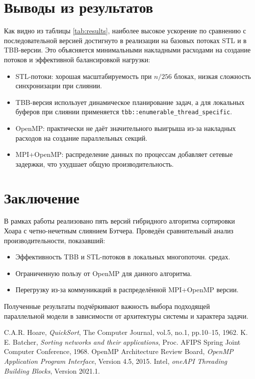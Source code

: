 \documentclass[12pt]{article}
\begin{document}
\section{Выводы из результатов}
\hspace*{1.25em}Как видно из таблицы \ref{tab:results}, наиболее высокое ускорение по сравнению с последовательной версией достигнуто в реализации на базовых потоках STL и в TBB-версии. Это объясняется минимальными накладными расходами на создание потоков и эффективной балансировкой нагрузки:

\begin{itemize}
  \item STL-потоки: хорошая масштабируемость при $n/256$ блоках, низкая сложность синхронизации при слиянии.
  \item TBB-версия использует динамическое планирование задач, а для локальных буферов при слиянии применяется \texttt{tbb::enumerable\_thread\_specific}.
  \item OpenMP: практически не даёт значительного выигрыша из-за накладных расходов на создание параллельных секций.
  \item MPI+OpenMP: распределение данных по процессам добавляет сетевые задержки, что ухудшает общую производительность.
\end{itemize}

\section{Заключение}
\hspace*{1.25em}В рамках работы реализовано пять версий гибридного алгоритма сортировки Хоара с четно-нечетным слиянием Бэтчера. Проведён сравнительный анализ производительности, показавший:

\begin{itemize}
  \item Эффективность TBB и STL-потоков в локальных многопоточн. средах.
  \item Ограниченную пользу от OpenMP для данного алгоритма.
  \item Перегрузку из-за коммуникаций в распределённой MPI+OpenMP версии.
\end{itemize}

\hspace*{1.25em}Полученные результаты подчёркивают важность выбора подходящей параллельной модели в зависимости от архитектуры системы и характера задачи.

\begin{thebibliography}{9}
  C.A.R. Hoare, \emph{QuickSort}, The Computer Journal, vol.5, no.1, pp.10–15, 1962.
  K. E. Batcher, \emph{Sorting networks and their applications}, Proc. AFIPS Spring Joint Computer Conference, 1968.
  OpenMP Architecture Review Board, \emph{OpenMP Application Program Interface}, Version 4.5, 2015.
  Intel, \emph{oneAPI Threading Building Blocks}, Version 2021.1.
\end{thebibliography}
\end{document}

